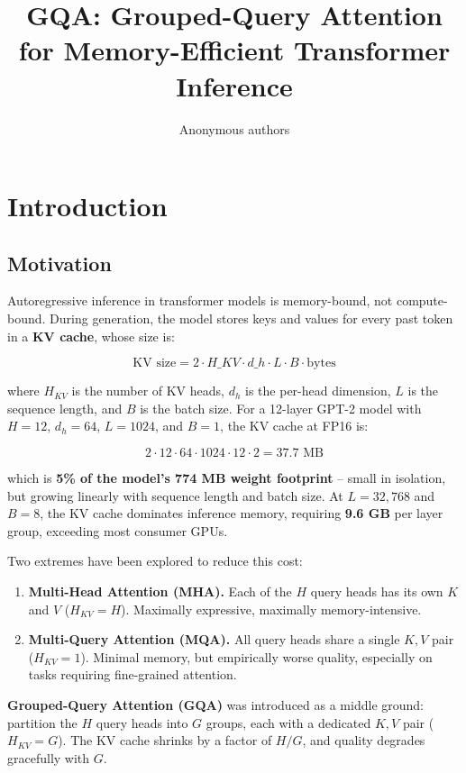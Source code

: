 \title{\textbf{GQA: Grouped-Query Attention for Memory-Efficient Transformer Inference}}

\author{Anonymous authors}



\section{Introduction}

\subsection{Motivation}

Autoregressive inference in transformer models is memory-bound, not 
compute-bound. During generation, the model stores keys and values for every 
past token in a \textbf{KV cache}, whose size is:

\[
\text{KV size} = 2 \cdot H\_{KV} \cdot d\_h \cdot L \cdot B \cdot \text{bytes}
\tag{1.1}
\]

where $H_{KV}$ is the number of KV heads, $d_h$ is the per-head dimension, 
$L$ is the sequence length, and $B$ is the batch size. For a 12-layer GPT-2 
model with $H = 12$, $d_h = 64$, $L = 1024$, and $B = 1$, the KV cache at 
FP16 is:

\[
2 \cdot 12 \cdot 64 \cdot 1024 \cdot 12 \cdot 2 = 37.7 \text{ MB}
\tag{1.2}
\]

which is \textbf{5\% of the model's 774 MB weight footprint} -- small in isolation, 
but growing linearly with sequence length and batch size. At $L = 32{,}768$ 
and $B = 8$, the KV cache dominates inference memory, requiring \textbf{9.6 GB} 
per layer group, exceeding most consumer GPUs.

Two extremes have been explored to reduce this cost:

\begin{enumerate}
\item \textbf{Multi-Head Attention (MHA).} Each of the $H$ query heads has its own
  $K$ and $V$ ($H_{KV} = H$). Maximally expressive, maximally memory-intensive.
\item \textbf{Multi-Query Attention (MQA).} All query heads share a single $K, V$
  pair ($H_{KV} = 1$). Minimal memory, but empirically worse quality,
  especially on tasks requiring fine-grained attention.

\end{enumerate}
\textbf{Grouped-Query Attention (GQA)} was introduced as a middle ground: partition 
the $H$ query heads into $G$ groups, each with a dedicated $K, V$ pair 
($H_{KV} = G$). The KV cache shrinks by a factor of $H / G$, and quality 
degrades gracefully with $G$.

